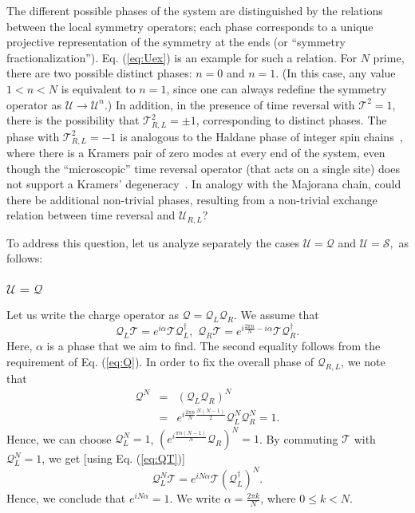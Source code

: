 \documentclass[twocolumn,aps,prb,showpacs]{revtex4-1}
\begin{document}
The different possible phases of the system are distinguished by the
relations between the local symmetry operators; each phase corresponds
to a unique projective representation of the symmetry at the ends
(or ``symmetry fractionalization''). Eq. (\ref{eq:Uex}) is an example
for such a relation. For $N$ prime, there are two possible distinct
phases: $n=0$ and $n=1$. (In this case, any value $1<n<N$ is equivalent
to $n=1$, since one can always redefine the symmetry operator as
$\mathcal{U}\rightarrow\mathcal{U}^{n}$.) In addition, in the presence
of time reversal with $\mathcal{T}^{2}=1$, there is the possibility
that $\mathcal{T}_{R,L}^{2}=\pm1$, corresponding to distinct phases.
The phase with $\mathcal{T}_{R,L}^{2}=-1$ is analogous to the Haldane
phase of integer spin chains~\cite{Haldane1983a}, where there is a Kramers pair
of zero modes at every end of the system, even though the ``microscopic''
time reversal operator (that acts on a single site) does not support
a Kramers' degeneracy~\cite{Pollmann2012}. In analogy with the Majorana chain, could there
be additional non-trivial phases, resulting from a non-trivial exchange
relation between time reversal and $\mathcal{U}_{R,L}$?

To address this question, let us analyze separately the cases $\mathcal{U=Q}$
and $\mathcal{U=S},$ as follows:

\subsubsection{$\mathcal{U=Q}$}

Let us write the charge operator as $\mathcal{Q}=\mathcal{Q}_{L}\mathcal{Q}_{R}$.
We assume that
\begin{equation}
\mathcal{Q}_{L}\mathcal{T}=e^{i \alpha}\mathcal{T}\mathcal{Q}_{L}^{\dagger},\,\,\mathcal{Q}_{R}\mathcal{T}=e^{i\frac{2\pi n}{N}-i\alpha}\mathcal{T}\mathcal{Q}_{R}^{\dagger}.\label{eq:QT}
\end{equation}
Here, $\alpha$ is a phase that we aim to find. The second equality follows from the requirement of Eq. (\ref{eq:Q}).
In order to fix the overall phase of $\mathcal{Q}_{R,L}$, we note
that
\begin{eqnarray}
\mathcal{Q}^{N} & = & \left(\mathcal{Q}_{L}\mathcal{Q}_{R}\right)^{N}\nonumber \\
 & = & e^{i\frac{2\pi n}{N}\frac{N(N-1)}{2}}\mathcal{Q}_{L}^{N}\mathcal{Q}_{R}^{N}=1.\label{eq:QN}
\end{eqnarray}
Hence, we can choose $\mathcal{Q}_{L}^{N}=1$, $\left(e^{i\frac{\pi n(N-1)}{N}}\mathcal{Q}_{R}\right)^{N}=1$.
By commuting $\mathcal{T}$ with $\mathcal{Q}_{L}^{N}=1$, we get
{[}using Eq. (\ref{eq:QT}){]}
\begin{equation}
\mathcal{Q}_{L}^{N}\mathcal{T}=e^{iN\alpha}\mathcal{T}\left(\mathcal{Q}_{L}^{\dagger}\right)^{N}.\label{eq:QN1}
\end{equation}
Hence, we conclude that $e^{iN\alpha}=1$. We write $\alpha=\frac{2\pi k}{N}$,
where $0\le k<N$.
\end{document}
